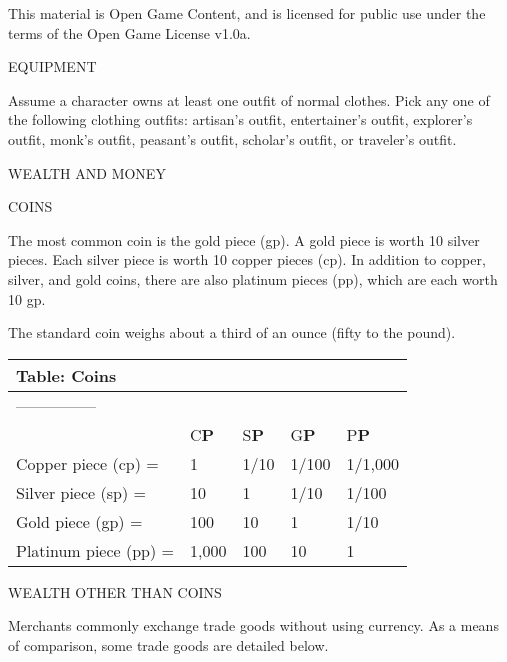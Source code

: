 \documentclass{article}
\begin{document}
This material is Open Game Content, and is licensed for public use under the terms 
of the Open Game License v1.0a.

{\LARGE{}EQUIPMENT}

Assume a character owns at least one outfit of normal clothes. Pick any one of 
the following clothing outfits: artisan's outfit, entertainer's outfit, explorer's 
outfit, monk's outfit, peasant's outfit, scholar's outfit, or traveler's outfit.

\vspace{12pt}
{\LARGE{}WEALTH AND MONEY}

COINS

The most common coin is the gold piece (gp). A gold piece is worth 10 silver pieces. 
Each silver piece is worth 10 copper pieces (cp). In addition to copper, silver, 
and gold coins, there are also platinum pieces (pp), which are each worth 10 gp.

The standard coin weighs about a third of an ounce (fifty to the pound).

\vspace{12pt}
\begin{tabular}{|>{\raggedright}p{85pt}|>{\raggedright}p{30pt}|>{\raggedright}p{24pt}|>{\raggedright}p{31pt}|>{\raggedright}p{40pt}|}
\hline
T\textbf{able: Coins} &  &  &  & \tabularnewline
\hline
 --------------- & \multicolumn{4}{p{127pt}|}{ \textbf{Exchange Value ------------}}\tabularnewline
\hline
  & C\textbf{P} & S\textbf{P} & G\textbf{P} & P\textbf{P}\tabularnewline
\hline
Copper piece (cp) = & 1 & 1/10 & 1/100 & 1/1,000\tabularnewline
\hline
Silver piece (sp) = & 10 & 1 & 1/10 & 1/100\tabularnewline
\hline
Gold piece (gp) = & 100 & 10 & 1 & 1/10\tabularnewline
\hline
Platinum piece (pp) = & 1,000 & 100 & 10 & 1\tabularnewline
\hline
\end{tabular}

\vspace{12pt}
WEALTH OTHER THAN COINS

Merchants commonly exchange trade goods without using currency. As a means of comparison, 
some trade goods are detailed below.
\end{document}
